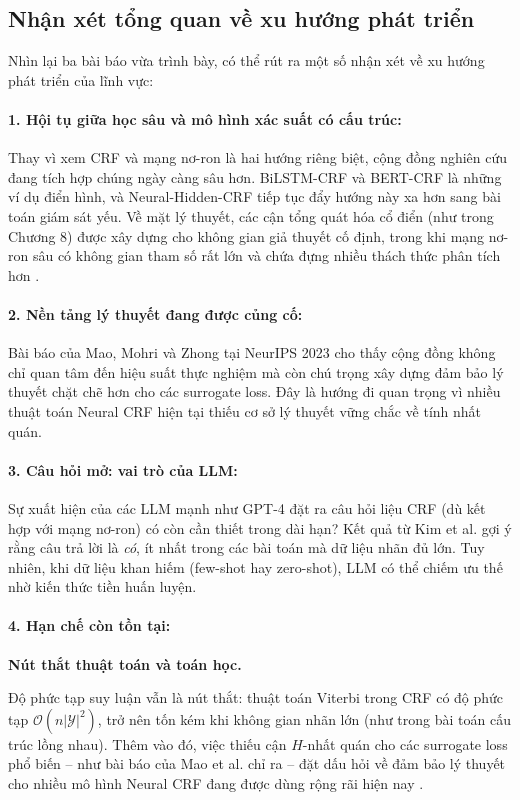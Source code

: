 \begin{expandbox}
\subsection{Nhận xét tổng quan về xu hướng phát triển}
\label{ssec:neural_crf_trends}
Nhìn lại ba bài báo vừa trình bày, có thể rút ra một số nhận xét về xu hướng phát triển của lĩnh vực:

\paragraph{1. Hội tụ giữa học sâu và mô hình xác suất có cấu trúc:}
Thay vì xem CRF và mạng nơ-ron là hai hướng riêng biệt, cộng đồng nghiên cứu đang tích hợp chúng ngày càng sâu hơn. BiLSTM-CRF và BERT-CRF là những ví dụ điển hình, và Neural-Hidden-CRF \cite{chen2023neural_hidden_crf} tiếp tục đẩy hướng này xa hơn sang bài toán giám sát yếu. Về mặt lý thuyết, các cận tổng quát hóa cổ điển (như trong Chương 8) được xây dựng cho không gian giả thuyết cố định, trong khi mạng nơ-ron sâu có không gian tham số rất lớn và chứa đựng nhiều thách thức phân tích hơn \cite{mohri2018foundations}.

\paragraph{2. Nền tảng lý thuyết đang được củng cố:}
Bài báo của Mao, Mohri và Zhong tại NeurIPS 2023 \cite{mao2023structured} cho thấy cộng đồng không chỉ quan tâm đến hiệu suất thực nghiệm mà còn chú trọng xây dựng đảm bảo lý thuyết chặt chẽ hơn cho các surrogate loss. Đây là hướng đi quan trọng vì nhiều thuật toán Neural CRF hiện tại thiếu cơ sở lý thuyết vững chắc về tính nhất quán.

\paragraph{3. Câu hỏi mở: vai trò của LLM:}
Sự xuất hiện của các LLM mạnh như GPT-4 đặt ra câu hỏi liệu CRF (dù kết hợp với mạng nơ-ron) có còn cần thiết trong dài hạn? Kết quả từ Kim et al. \cite{kim2024nested_ner} gợi ý rằng câu trả lời là \textit{có}, ít nhất trong các bài toán mà dữ liệu nhãn đủ lớn. Tuy nhiên, khi dữ liệu khan hiếm (few-shot hay zero-shot), LLM có thể chiếm ưu thế nhờ kiến thức tiền huấn luyện.

\paragraph{4. Hạn chế còn tồn tại:}
\textbf{Nút thắt thuật toán và toán học.}

Độ phức tạp suy luận vẫn là nút thắt: thuật toán Viterbi trong CRF có độ phức tạp $\mathcal{O}(n|\mathcal{Y}|^2)$, trở nên tốn kém khi không gian nhãn lớn (như trong bài toán cấu trúc lồng nhau). Thêm vào đó, việc thiếu cận $H$-nhất quán cho các surrogate loss phổ biến -- như bài báo của Mao et al. chỉ ra -- đặt dấu hỏi về đảm bảo lý thuyết cho nhiều mô hình Neural CRF đang được dùng rộng rãi hiện nay \cite{mao2023structured}.
\end{expandbox}
